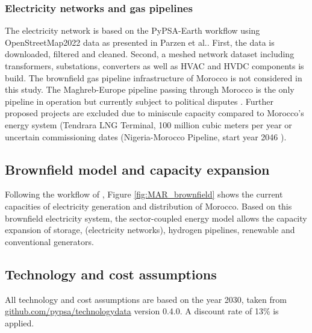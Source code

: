 \subsubsection*{Electricity networks and gas pipelines}
The electricity network is based on the PyPSA-Earth workflow using OpenStreetMap2022 data \cite{OpenStreetMap2022} as presented in Parzen et al.\cite{Parzen2023}. First, the data is downloaded, filtered and cleaned. Second, a meshed network dataset including transformers, substations, converters as well as HVAC and HVDC components is build\cite{Parzen2023}. 
The brownfield gas pipeline infrastructure of Morocco is not considered in this study. The Maghreb-Europe pipeline passing through Morocco is the only pipeline in operation but currently subject to political disputes \cite{Rachidi2022}. Further proposed projects are excluded due to  miniscule capacity compared to Morocco's energy system (Tendrara LNG Terminal, 100 million cubic meters per year %
 or uncertain commissioning dates (Nigeria-Morocco Pipeline, start year 2046 \cite{GEM2023b}).


\subsection*{Brownfield model and capacity expansion}
\label{brownfield_model}
Following the workflow of \cite{Parzen2023}, Figure \ref{fig:MAR_brownfield} shows the current capacities of electricity generation and distribution of Morocco. Based on this brownfield electricity system, the sector-coupled energy model allows the capacity expansion of storage, (electricity networks), hydrogen pipelines, renewable and conventional generators.

\subsection*{Technology and cost assumptions}
\label{subsec:tech_assump}
All technology and cost assumptions are based on the year 2030, taken from \href{https://github.com/pypsa/technologydata}{github.com/pypsa/technologydata} version 0.4.0. A discount rate of 13\% is applied.


